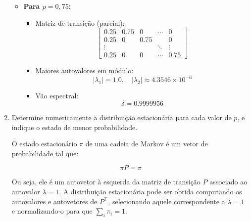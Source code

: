 \begin{enumerate}
\begin{resposta}
\begin{itemize}
            \item \textbf{Para $p = 0{,}75$:}
            \begin{itemize}
                \item Matriz de transição (parcial):
                $$
                \begin{bmatrix}
                0.25 & 0.75 & 0    & \cdots & 0 \\
                0.25 & 0    & 0.75 &        & 0 \\
                \vdots &     &     & \ddots & \vdots \\
                0.25 & 0    & 0    & \cdots & 0.75
                \end{bmatrix}
                $$
                \item Maiores autovalores em módulo:
                $$ |\lambda_1| = 1.0, \quad |\lambda_2| \approx 4.3546 \times 10^{-6} $$
                \item Vão espectral:
                $$ \boxed{\delta = 0.9999956} $$
            \end{itemize}
        \end{itemize}
        


    \end{resposta}
    \item Determine numericamente a distribuição estacionária para cada valor de $p$, e indique o estado de menor probabilidade.
    \begin{resposta}
        O estado estacionário $\pi$ de uma cadeia de Markov é um vetor de probabilidade tal que:

        $$ \pi P = \pi $$

        Ou seja, ele é um autovetor à esquerda da matriz de transição $P$ associado ao autovalor $\lambda = 1$. 
        A distribuição estacionária pode ser obtida computando os autovalores e autovetores de $P^\top$, selecionando aquele correspondente a $\lambda = 1$ e normalizando-o para que $\sum_i \pi_i = 1$.


\end{resposta}
\end{enumerate}
